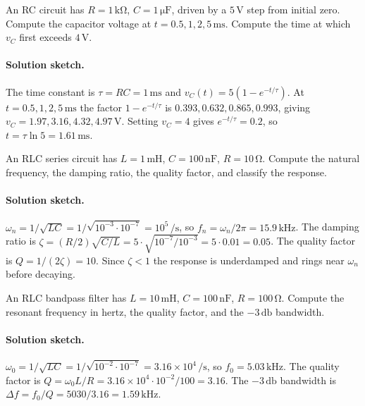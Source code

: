 \begin{exercise}
An RC circuit has $R = 1\,\si{\kilo\ohm}$, $C = 1\,\si{\micro\farad}$,
driven by a $5\,\si{\volt}$ step from initial zero. Compute the
capacitor voltage at $t = 0.5, 1, 2, 5\,\si{\milli\second}$. Compute
the time at which $v_{C}$ first exceeds $4\,\si{\volt}$.
\paragraph{Solution sketch.}
The time constant is $\tau = RC = 1\,\si{\milli\second}$ and
$v_{C}(t) = 5(1-e^{-t/\tau})$. At $t = 0.5, 1, 2, 5\,\si{\milli
\second}$ the factor $1-e^{-t/\tau}$ is $0.393, 0.632, 0.865, 0.993$,
giving $v_{C} = 1.97, 3.16, 4.32, 4.97\,\si{\volt}$. Setting $v_{C}=4$
gives $e^{-t/\tau} = 0.2$, so $t = \tau\ln 5 = 1.61\,\si{\milli
\second}$.
\end{exercise}

\begin{exercise}
An RLC series circuit has $L = 1\,\si{\milli\henry}$, $C = 100\,\si{
\nano\farad}$, $R = 10\,\si{\ohm}$. Compute the natural frequency, the
damping ratio, the quality factor, and classify the response.
\paragraph{Solution sketch.}
$\omega_{n} = 1/\sqrt{LC} = 1/\sqrt{10^{-3}\cdot 10^{-7}} =
10^{5}\,\si{\per\second}$, so $f_{n} = \omega_{n}/2\pi = 15.9\,\si{\kilo
\hertz}$. The damping ratio is $\zeta = (R/2)\sqrt{C/L} = 5\cdot
\sqrt{10^{-7}/10^{-3}} = 5\cdot 0.01 = 0.05$. The quality factor is
$Q = 1/(2\zeta) = 10$. Since $\zeta < 1$ the response is underdamped
and rings near $\omega_{n}$ before decaying.
\end{exercise}

\begin{exercise}
An RLC bandpass filter has $L = 10\,\si{\milli\henry}$, $C = 100\,\si{
\nano\farad}$, $R = 100\,\si{\ohm}$. Compute the resonant frequency in
hertz, the quality factor, and the $-3\,\si{\decibel}$ bandwidth.
\paragraph{Solution sketch.}
$\omega_{0} = 1/\sqrt{LC} = 1/\sqrt{10^{-2}\cdot 10^{-7}} =
3.16\times 10^{4}\,\si{\per\second}$, so $f_{0} = 5.03\,\si{\kilo
\hertz}$. The quality factor is $Q = \omega_{0}L/R = 3.16\times
10^{4}\cdot 10^{-2}/100 = 3.16$. The $-3\,\si{\decibel}$ bandwidth is
$\Delta f = f_{0}/Q = 5030/3.16 = 1.59\,\si{\kilo\hertz}$.
\end{exercise}


